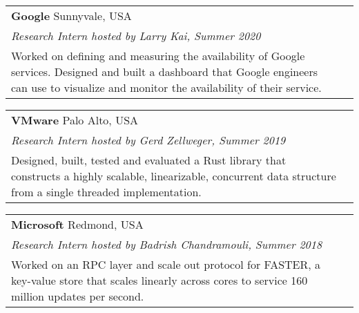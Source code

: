 \documentclass[margin,line]{res}
\begin{document}
\begin{resume}
\vspace{-7pt}
\begin{tabular}{@{}p{5.5in}p{4in}}
{\bf Google} \dotfill Sunnyvale, USA \\
{\small\em Research Intern hosted by Larry Kai, Summer 2020}\\
{\small Worked on defining and measuring the availability of Google
services. Designed and built a dashboard that Google engineers
can use to visualize and monitor the availability of their service.}
\end{tabular}

\vspace{-7pt}
\begin{tabular}{@{}p{5.5in}p{4in}}
{\bf VMware} \dotfill Palo Alto, USA \\
{\small\em Research Intern hosted by Gerd Zellweger, Summer 2019}\\
{\small
Designed,
built, tested and evaluated a Rust library that constructs a highly scalable, linearizable,
concurrent data
structure from a single threaded implementation.}
\end{tabular}

\vspace{-7pt}
\begin{tabular}{@{}p{5.5in}p{4in}}
{\bf Microsoft} \dotfill Redmond, USA \\
{\small\em Research Intern hosted by Badrish Chandramouli, Summer 2018}\\
{\small Worked on an RPC layer and scale out protocol for FASTER, a
key-value store that scales linearly across cores to service 160 million
updates per second.}
\end{tabular}




\end{resume}
\end{document}
